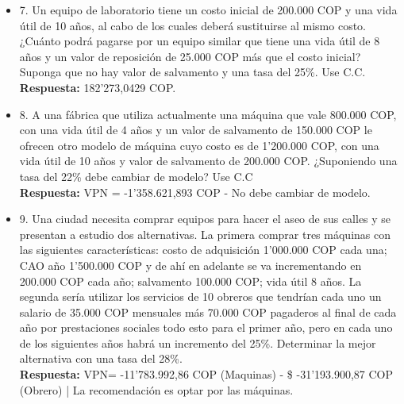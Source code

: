 \begin{itemize}
       a) El flujo neto de caja de cada año.\\
       b) Evaluar el proyecto con una tasa del 45\%.\\

       \textbf{Respuesta:}
       \setlength{\parskip}{0cm}   
       \[ A=P\bullet i /1-{(1+i)}^{-n}= \frac{2'000.000\$\bullet(0,38)}{1-{(1,38)}^{-3}}=1'226.809,82\ COP\ \]
       VPN=5'982.793\ \$
       \medskip

 \item 7. Un equipo de laboratorio tiene un costo inicial de 200.000 COP y una vida útil de 10 años, al cabo de los cuales deberá sustituirse al mismo costo. ¿Cuánto podrá pagarse por un equipo similar que tiene una vida útil de 8 años y un valor de reposición de 25.000 COP más que el costo inicial? Suponga que no hay valor de salvamento y una tasa del 25\%. Use C.C. \\

       \textbf{Respuesta:} 182'273,0429 COP.

       \medskip

 \item 8. A una fábrica que utiliza actualmente una máquina que vale 800.000 COP, con una vida útil de 4 años y un valor de salvamento de 150.000 COP le ofrecen otro modelo de máquina cuyo costo es de 1'200.000 COP, con una vida útil de 10 años y valor de salvamento de  200.000 COP. ¿Suponiendo una tasa del 22\% debe cambiar de modelo? Use C.C \\

       \textbf{Respuesta:} VPN =  -1'358.621,893 COP - No debe cambiar de modelo.

       \medskip

 \item 9. Una ciudad necesita comprar equipos para hacer el aseo de sus calles y se presentan a estudio dos alternativas. La primera comprar tres máquinas con las siguientes características: costo de adquisición 1'000.000 COP cada una; CAO año 1'500.000 COP y de ahí en adelante se va incrementando en 200.000 COP cada año; salvamento 100.000 COP; vida útil 8 años. La segunda sería utilizar los servicios de 10 obreros que tendrían cada uno un salario de 35.000 COP mensuales más 70.000 COP pagaderos al final de cada año por prestaciones sociales todo esto para el primer año, pero en cada uno de los siguientes años habrá un incremento del 25\%. Determinar la mejor alternativa con una tasa del 28\%. \\

       \textbf{Respuesta:} VPN=  -11'783.992,86 COP (Maquinas) - \$ -31'193.900,87 COP (Obrero) | La recomendación es optar por las máquinas.


\end{itemize}
